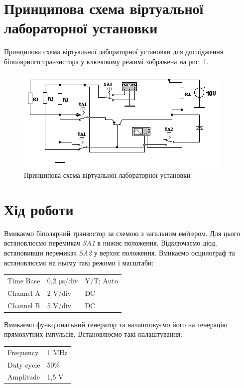 \documentclass[a4paper,oneside,DIV=10,12pt]{scrartcl}
\newcommand\schel[1]{\textit{#1}}
\begin{document}
	\section{Принципова схема віртуальної лабораторної установки}
		Принципова схема віртуальної лабораторної установки для дослідження біполярного транзистора у ключовому режимі зображена на рис. \ref{fig:schematic}.
		\begin{figure}[H]
			\centering
			\includegraphics[width=\textwidth]{lab-03-01-schematic.png}
			\caption{Принципова схема віртуальної лабораторної установки}
			\label{fig:schematic}
		\end{figure}
		
	\section{Хід роботи}
		Вмикаємо біполярний транзистор за схемою з загальним емітером. Для цього встановлюємо перемикач \schel{SA1} в нижнє положення. Відключаємо діод, встановивши перемикач \schel{SA2} у верхнє положення. Вмикаємо осцилограф та встановлюємо на ньому такі режими і масштаби:
		\begin{table}[H]
		\centering
			\begin{tabular}{lll}
			Time Base & 0,2 μs/div & Y/T; Auto\\
			Channel A & 2 V/div & DC \\
			Channel B & 5 V/div & DC
			\end{tabular}
		\end{table}
		
		Вмикаємо функціональний генератор та налаштовуємо його на генерацію прямокутних імпульсів. Встановлюємо такі налаштування:
		\begin{table}[H]
		\centering
			\begin{tabular}{ll}
			Frequency & 1 MHz\\
			Duty cycle & 50\%\\
			Amplitude & 1,5 V
			\end{tabular}
		\end{table}
		
\end{document}

